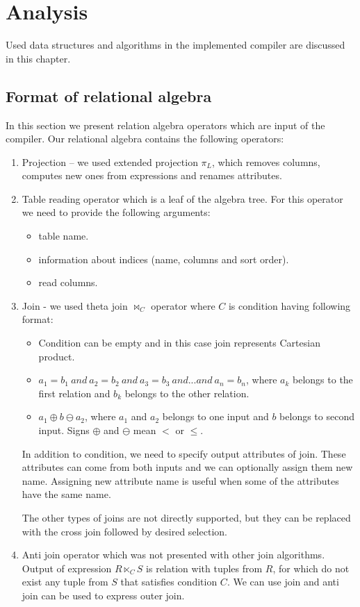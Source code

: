 \chapter{Analysis}
\label{analysis}
Used data structures and algorithms in the implemented compiler are discussed in this chapter.
\section{Format of relational algebra}

In this section we present relation algebra operators which are input of the compiler. Our relational algebra contains the following operators:
\begin{enumerate}
\item Projection -- we used extended projection $\pi_L$, which removes columns, computes new ones from expressions and renames attributes.

\item Table reading operator which is a leaf of the algebra tree. For this operator we need to provide the following arguments:
\begin{itemize}
\item table name.
\item information about indices (name, columns and sort order).
\item read columns.
\end{itemize}
\item Join - we used theta join $\Join_C$ operator where $C$ is condition having following format:
\begin{itemize}
\item Condition can be empty and in this case join represents Cartesian product.
\item $a_1=b_1~and~a_2=b_2~and~a_3=b_3~and...and~a_n=b_n$, where $a_k$ belongs to the first relation and $b_k$ belongs to the other relation.
\item $a_1\oplus b \ominus a_2$, where $a_1$ and $a_2$ belongs to one input and $b$ belongs to second input. Signs $\oplus$ and $\ominus$ mean $<$ or $\leq$.

\end{itemize}

In addition to condition, we need to specify output attributes of join. These attributes can come from both inputs and we can optionally assign them new name. Assigning new attribute name is useful when some of the attributes have the same name.

The other types of joins are not directly supported, but they can be replaced with the cross join followed by desired selection.
\item Anti join operator which was not presented with other join algorithms. Output of expression $R \ltimes_C S$ is relation with tuples from $R$, for which do not exist any tuple from $S$ that satisfies condition $C$. We can use join and anti join can be used to express outer join.
 

\end{enumerate}
